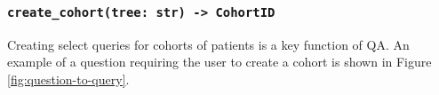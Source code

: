 \documentclass[11pt]{article}
\begin{document}
\subsubsection*{\texttt{create\_cohort(tree: str) -> CohortID}}
Creating select queries for cohorts of patients is a key function of QA.
An example of a question requiring the user to create a cohort is shown in Figure \ref{fig:question-to-query}.







\end{document}
